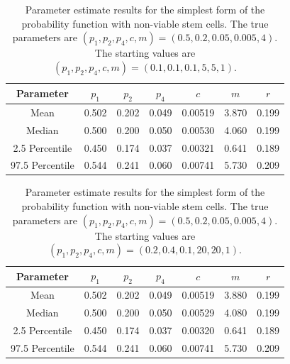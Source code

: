 \documentclass[11pt]{article}
\begin{document}
\begin{table}[!ht]
    \centering
    \begin{tabular}{|c|c|c|c|c|c|c|}
    \hline
         Parameter& $p_1$ & $p_2$ &$p_4$ &$c$  & $m$ & $r$\\
         \hline
         Mean &  0.502 & 0.202 & 0.049 & 0.00519 & 3.870 & 0.199\\
         Median& 0.500 & 0.200 & 0.050 & 0.00530 & 4.060 & 0.199  \\
         2.5 Percentile& 0.450 & 0.174 & 0.037 & 0.00321 & 0.641 & 0.189 \\
         97.5 Percentile& 0.544 & 0.241 & 0.060 & 0.00741 & 5.730 & 0.209\\
         \hline
    \end{tabular}
    \caption{Parameter estimate results for the simplest form of the probability function with non-viable stem cells. The true parameters are $(p_1, p_2, p_4, c, m) = (0.5, 0.2, 0.05, 0.005, 4)$. The starting values are $(p_1, p_2, p_4, c, m) = (0.1, 0.1, 0.1, 5, 5, 1)$.}
    \label{tab:simple_with_p4_start01}
\end{table}


\begin{table}[!ht]
    \centering
    \begin{tabular}{|c|c|c|c|c|c|c|}
    \hline
         Parameter& $p_1$ & $p_2$ &$p_4$ &$c$  & $m$ & $r$\\
         \hline
         Mean &  0.502 & 0.202 & 0.049 & 0.00519 & 3.880 & 0.199\\
         Median& 0.500 & 0.200 & 0.050 & 0.00529 & 4.080 & 0.199  \\
         2.5 Percentile& 0.450 & 0.174 & 0.037 & 0.00320 & 0.641 & 0.189 \\
         97.5 Percentile& 0.544 & 0.241 & 0.060 & 0.00741 & 5.730 & 0.209\\
         \hline
    \end{tabular}
    \caption{Parameter estimate results for the simplest form of the probability function with non-viable stem cells. The true parameters are $(p_1, p_2, p_4, c, m) = (0.5, 0.2, 0.05, 0.005, 4)$. The starting values are $(p_1, p_2, p_4, c, m) = (0.2, 0.4, 0.1, 20, 20, 1)$.}
    \label{tab:simple_with_p4_start02}
\end{table}
\newpage
\clearpage
\end{document}
